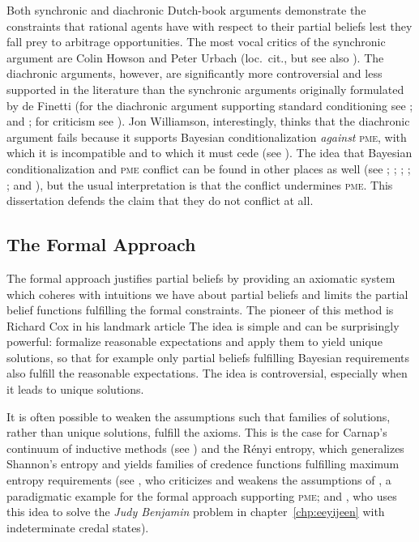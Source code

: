 \documentclass[phd,12pt,oneside]{ubcthesis}
\begin{document}
Both synchronic and diachronic Dutch-book arguments demonstrate the
constraints that rational agents have with respect to their partial
beliefs lest they fall prey to arbitrage opportunities. The most vocal
critics of the synchronic argument are Colin Howson and Peter Urbach
(loc.\ cit., but see also ). The diachronic
arguments, however, are significantly more controversial and less
supported in the literature than the synchronic arguments originally
formulated by de Finetti (for the diachronic argument supporting
standard conditioning see ; and
; for criticism see
). Jon Williamson, interestingly,
thinks that the diachronic argument fails because it supports Bayesian
conditionalization \emph{against} \textsc{pme}, with which it is
incompatible and to which it must cede (see
). The idea that Bayesian conditionalization
and \textsc{pme} conflict can be found in other places as well (see
; ;
; ;
; and
), but the usual interpretation is
that the conflict undermines \textsc{pme}. This dissertation defends the
claim that they do not conflict at all.

\subsection{The Formal Approach}
\label{subsec:ahghuato}

The formal approach justifies partial beliefs by providing an
axiomatic system which coheres with intuitions we have about partial
beliefs and limits the partial belief functions fulfilling the formal
constraints. The pioneer of this method is Richard Cox in his landmark
article  The
idea is simple and can be surprisingly powerful: formalize reasonable
expectations and apply them to yield unique solutions, so that for
example only partial beliefs fulfilling Bayesian requirements also
fulfill the reasonable expectations. The idea is controversial,
especially when it leads to unique solutions.

It is often possible to weaken the assumptions such that families of
solutions, rather than unique solutions, fulfill the axioms. This is
the case for Carnap's con\-ti\-nuum of inductive methods (see
) and the R{\'e}nyi entropy, which generalizes
Shannon's entropy and yields families of credence functions fulfilling
maximum entropy requirements (see , who
criticizes and weakens the assumptions of ,
a paradigmatic example for the formal approach supporting
\textsc{pme}; and , who uses this idea to solve
the \emph{Judy Benjamin} problem in chapter~\ref{chp:eeyijeen} with
indeterminate credal states).
\end{document}
